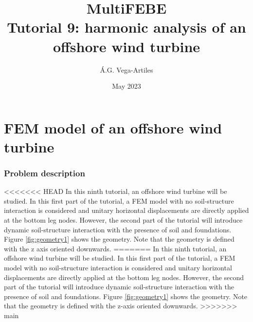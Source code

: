 \documentclass[a4]{article}
\title{MultiFEBE \\ Tutorial 9: harmonic analysis of an offshore wind turbine}
\author{\'A.G. Vega-Artiles}
\date{May 2023}
\begin{document}
\maketitle

\tableofcontents

\part{FEM model of an offshore wind turbine}

\section{Problem description}

<<<<<<< HEAD
In this ninth tutorial, an offshore wind turbine will be studied. In this first part of the tutorial, a FEM model with no soil-structure interaction is considered and unitary horizontal displacements are directly applied at the bottom leg nodes. However, the second part of the tutorial will introduce dynamic soil-structure interaction with the presence of soil and foundations. Figure \ref{fig:geometry1} shows the geometry. Note that the geometry is defined with the z axis oriented downwards.
=======
In this ninth tutorial, an offshore wind turbine will be studied. In this first part of the tutorial, a FEM model with no soil-structure interaction is considered and unitary horizontal displacements are directly applied at the bottom leg nodes. However, the second part of the tutorial will introduce dynamic soil-structure interaction with the presence of soil and foundations. Figure \ref{fig:geometry1} shows the geometry. Note that the geometry is defined with the z-axis oriented downwards.
>>>>>>> main
\end{document}
